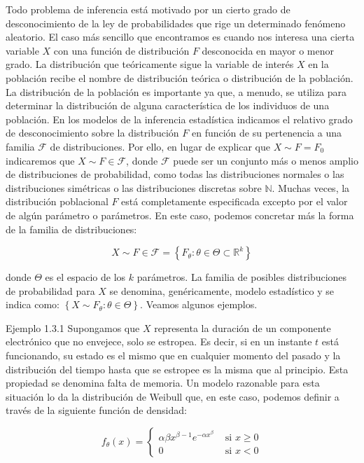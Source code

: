 \documentclass[
]{article}
\begin{document}
Todo problema de inferencia está motivado por un cierto grado de desconocimiento de la ley de probabilidades que rige un determinado fenómeno aleatorio.
El caso más sencillo que encontramos es cuando nos interesa una cierta variable \(X\) con una función de distribución \(F\) desconocida en mayor o menor grado.
La distribución que teóricamente sigue la variable de interés \(X\) en la población recibe el nombre de distribución teórica o distribución de la población. La distribución de la población es importante ya que, a menudo, se utiliza para determinar la distribución de alguna característica de los individuos de una población.
En los modelos de la inferencia estadística indicamos el relativo grado de desconocimiento sobre la distribución \(F\) en función de su pertenencia a una familia \(\mathcal{F}\) de distribuciones. Por ello, en lugar de explicar que \(X \sim F=F_{0}\) indicaremos que \(X \sim F \in \mathcal{F}\), donde \(\mathcal{F}\) puede ser un conjunto más o menos amplio de distribuciones de probabilidad, como todas las distribuciones normales o las distribuciones simétricas o las distribuciones discretas sobre \(\mathbb{N}\).
Muchas veces, la distribución poblacional \(F\) está completamente especificada excepto por el valor de algún parámetro o parámetros. En este caso, podemos concretar más la forma de la familia de distribuciones:

\[
X \sim F \in \mathcal{F}=\left\{F_{\theta}: \theta \in \Theta \subset \mathbb{R}^{k}\right\}
\]

donde \(\Theta\) es el espacio de los \(k\) parámetros.
La familia de posibles distribuciones de probabilidad para \(X\) se denomina, genéricamente, modelo estadístico y se indica como: \(\left\{X \sim F_{\theta}: \theta \in \Theta\right\}\). Veamos algunos ejemplos.

Ejemplo 1.3.1 Supongamos que \(X\) representa la duración de un componente electrónico que no envejece, solo se estropea. Es decir, si en un instante \(t\) está funcionando, su estado es el mismo que en cualquier momento del pasado y la distribución del tiempo hasta que se estropee es la misma que al principio. Esta propiedad se denomina falta de memoria.
Un modelo razonable para esta situación lo da la distribución de Weibull que, en este caso, podemos definir a través de la siguiente función de densidad:

\[
f_{\theta}(x)= \begin{cases}\alpha \beta x^{\beta-1} e^{-\alpha x^{\beta}} & \text { si } x \geq 0 \\ 0 & \text { si } x<0\end{cases}
\]
\end{document}
